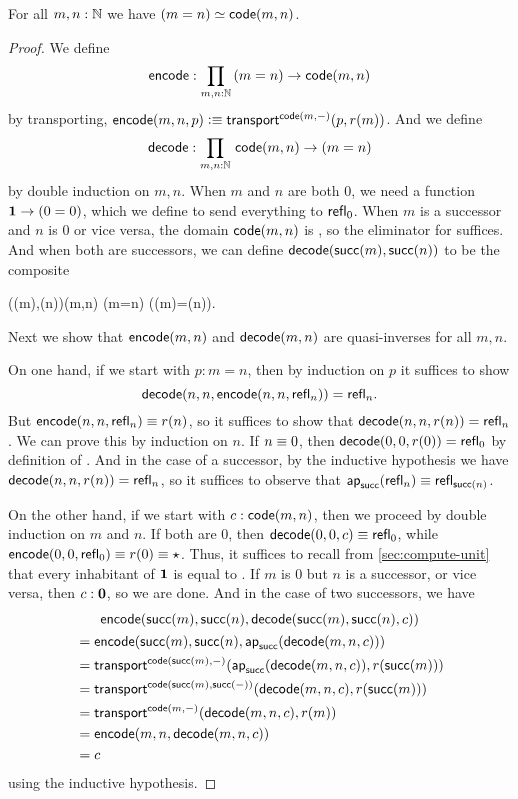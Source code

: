 \begin{thm}\label{thm:path-nat}
  For all $m,n:\mathbb{N}$ we have $(m=n) \simeq \mathsf{code}(m,n)$.
\end{thm}
\begin{proof}
  We define
  \[ \encode : \prd{m,n:\N} (m=n) \to \code(m,n) \]
  by transporting, $\mathsf{encode}(m,n,p) \vcentcolon\equiv \mathsf{transport}^{\mathsf{code}(m,{-})}(p,r(m))$.
  And we define
  \[ \decode : \prd{m,n:\N} \code(m,n) \to (m=n) \]
  by double induction on $m,n$.
  When $m$ and $n$ are both $0$, we need a function $\mathbf{1} \to (0=0)$, which we define to send everything to $\mathsf{refl}_{0}$.
  When $m$ is a successor and $n$ is $0$ or vice versa, the domain $\mathsf{code}(m,n)$ is \emptyt, so the eliminator for \emptyt suffices.
  And when both are successors, we can define $\mathsf{decode}(\mathsf{succ}(m),\mathsf{succ}(n))$ to be the composite
  \begin{narrowmultline*}
    \code(\suc(m),\suc(n))\jdeq\code(m,n)
     \narrowbreak
    (m=n)
    \xrightarrow{\apfunc{\suc}}
    (\suc(m)=\suc(n)).
  \end{narrowmultline*}
  Next we show that $\mathsf{encode}(m,n)$ and $\mathsf{decode}(m,n)$ are quasi-inverses for all $m,n$.

  On one hand, if we start with $p:m=n$, then by induction on $p$ it suffices to show
  \[\mathsf{decode}(n,n,\mathsf{encode}(n,n,\mathsf{refl}_{n}))=\mathsf{refl}_{n}.\]
  But $\mathsf{encode}(n,n,\mathsf{refl}_{n}) \equiv r(n)$, so it suffices to show that $\mathsf{decode}(n,n,r(n)) =\mathsf{refl}_{n}$.
  We can prove this by induction on $n$.
  If $n\equiv 0$, then $\mathsf{decode}(0,0,r(0)) =\mathsf{refl}_{0}$ by definition of \decode.
  And in the case of a successor, by the inductive hypothesis we have $\mathsf{decode}(n,n,r(n)) = \mathsf{refl}_{n}$, so it suffices to observe that $\mathsf{ap}_{\mathsf{succ}}(\mathsf{refl}_{n}) \equiv \mathsf{refl}_{\mathsf{succ}(n)}$.

  On the other hand, if we start with $c:\mathsf{code}(m,n)$, then we proceed by double induction on $m$ and $n$.
  If both are $0$, then $\mathsf{decode}(0,0,c) \equiv \mathsf{refl}_{0}$, while $\mathsf{encode}(0,0,\mathsf{refl}_{0})\equiv r(0) \equiv \star$.
  Thus, it suffices to recall from \autoref{sec:compute-unit} that every inhabitant of $\mathbf{1}$ is equal to \ttt.
  If $m$ is $0$ but $n$ is a successor, or vice versa, then $c:\mathbf{0}$, so we are done.
  And in the case of two successors, we have
  \begin{multline*}
    \mathsf{encode}(\mathsf{succ}(m),\mathsf{succ}(n),\mathsf{decode}(\mathsf{succ}(m),\mathsf{succ}(n),c))\\
    \begin{aligned}
    &= \mathsf{encode}(\mathsf{succ}(m),\mathsf{succ}(n),\mathsf{ap}_{\mathsf{succ}}(\mathsf{decode}(m,n,c)))\\
    &= \mathsf{transport}^{\mathsf{code}(\mathsf{succ}(m),{-})}(\mathsf{ap}_{\mathsf{succ}}(\mathsf{decode}(m,n,c)),r(\mathsf{succ}(m)))\\
    &= \mathsf{transport}^{\mathsf{code}(\mathsf{succ}(m),\mathsf{succ}({-}))}(\mathsf{decode}(m,n,c),r(\mathsf{succ}(m)))\\
    &= \mathsf{transport}^{\mathsf{code}(m,{-})}(\mathsf{decode}(m,n,c),r(m))\\
    &= \mathsf{encode}(m,n,\mathsf{decode}(m,n,c))\\
    &= c
  \end{aligned}
  \end{multline*}
  using the inductive hypothesis.
\end{proof}


